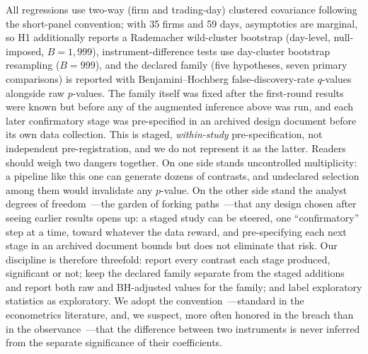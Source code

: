 All regressions use two-way (firm and trading-day) clustered covariance following the short-panel convention; with 35 firms and 59 days, asymptotics are marginal, so H1 additionally reports a Rademacher wild-cluster bootstrap (day-level, null-imposed, $B=1{,}999$), instrument-difference tests use day-cluster bootstrap resampling ($B=999$), and the declared family (five hypotheses, seven primary comparisons) is reported with Benjamini--Hochberg false-discovery-rate $q$-values alongside raw $p$-values. The family itself was fixed after the first-round results were known but before any of the augmented inference above was run, and each later confirmatory stage was pre-specified in an archived design document before its own data collection. This is staged, \emph{within-study} pre-specification, not independent pre-registration, and we do not represent it as the latter. Readers should weigh two dangers together. On one side stands uncontrolled multiplicity: a pipeline like this one can generate dozens of contrasts, and undeclared selection among them would invalidate any $p$-value. On the other side stand the analyst degrees of freedom~---the garden of forking paths~---that any design chosen after seeing earlier results opens up: a staged study can be steered, one ``confirmatory'' step at a time, toward whatever the data reward, and pre-specifying each next stage in an archived document bounds but does not eliminate that risk. Our discipline is therefore threefold: report every contrast each stage produced, significant or not; keep the declared family separate from the staged additions and report both raw and BH-adjusted values for the family; and label exploratory statistics as exploratory. We adopt the convention~---standard in the econometrics literature, and, we suspect, more often honored in the breach than in the observance~---that the difference between two instruments is never inferred from the separate significance of their coefficients.
